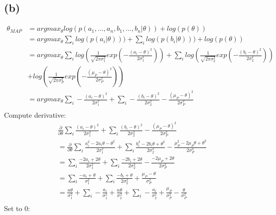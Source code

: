 \documentclass[a4paper]{scrartcl}
\begin{document}
  \subsection*{(b)}
    \begin{align*}
      \theta_{MAP}
      &= argmax_\theta log(p(a_1, \dots , a_n, b_1, \dots , b_n \vert \theta)) + log(p(\theta))\\
      &= argmax_\theta \sum_i log(p(a_i \vert \theta))) + \sum_i log(p(b_i \vert \theta )))+ log(p(\theta))\\
      &= argmax_\theta \sum_i log(\frac{1}{\sqrt{2\pi \sigma_1^2}} exp(-\frac{(a_i - \theta )^2}{2\sigma_1^2})) + \sum_i log(\frac{1}{\sqrt{2\pi \sigma_2^2}} exp(-\frac{(b_i - \theta )^2}{2\sigma_2^2})) \\
      &+ log(\frac{1}{\sqrt{2 \pi \sigma_P^2}}exp(-\frac{(\mu_P - \theta)^2}{2\sigma_P^2})) \\
      &= argmax_\theta \sum_i -\frac{(a_i - \theta )^2}{2\sigma_1^2} + \sum_i-\frac{(b_i - \theta )^2}{2\sigma_2^2} - \frac{(\mu_P - \theta)^2}{2\sigma_P^2}\\ 
    \end{align*}
    Compute derivative:
    \begin{align*}
      & \frac{\partial}{\partial \theta} \sum_i \frac{(a_i - \theta )^2}{2\sigma_1^2} + \sum_i \frac{(b_i - \theta )^2}{2\sigma_2^2}- \frac{(\mu_P - \theta)^2}{2\sigma_P^2}\\
      &= \frac{\partial}{\partial \theta} \sum_i \frac{a_i^2 - 2a_i \theta - \theta^2}{2\sigma_1^2} + \sum_i \frac{b_i^2 -2b_i \theta + \theta^2}{2\sigma_2^2}- \frac{\mu_P^2 - 2\mu_P \theta + \theta^2}{2\sigma_P^2}\\
      &= \sum_i \frac{-2a_i + 2\theta}{2\sigma_1^2} + \sum_i \frac{-2b_i  + 2\theta}{2\sigma_2^2}- \frac{- 2\mu_P + 2\theta}{2\sigma_P^2}\\
      &= \sum_i \frac{-a_i + \theta}{\sigma_1^2} + \sum_i \frac{-b_i  + \theta}{2\sigma_2^2} + \frac{\mu_P - \theta}{\sigma_P^2}\\
      &= \frac{n \theta }{\sigma_1^2} + \sum_i - \frac{a_i}{\sigma_1^2} + \frac{n \theta }{\sigma_2^2} + \sum_i - \frac{a_i}{\sigma_2^2} + \frac{\mu_P}{\sigma_P^2} - \frac{\theta}{\sigma_P^2}\\
    \end{align*}
    Set to 0:
\end{document}
